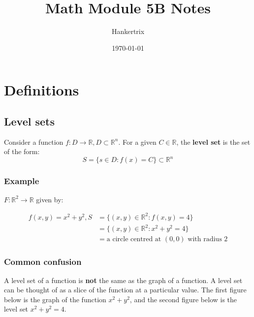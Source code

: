 \documentclass[11pt]{article}
\author{Hankertrix}
\date{\today}
\title{Math Module 5B Notes}
\begin{document}
\maketitle
\setcounter{tocdepth}{2}
\tableofcontents \clearpage\section{Definitions}
\label{sec:orgd9169ac}

\subsection{Level sets}
\label{sec:orge629cca}
Consider a function \(f : D \rightarrow \mathbb{R}, D \subset \mathbb{R}^n\). For a given \(C \in \mathbb{R}\), the \textbf{level set} is the set of the form:
\[S = \{s \in D : f(x) = C\} \subset \mathbb{R}^n\]
\subsubsection{Example}
\label{sec:org67f94d0}
\(F: \mathbb{R}^2 \rightarrow \mathbb{R}\) given by:

\begin{align*}
f(x, y) = x^2 + y^2, S &= \{(x, y) \in \mathbb{R}^2 : f(x, y) = 4\} \\
&= \{(x, y) \in \mathbb{R}^2 : x^2 + y^2 = 4\} \\
&= \text{a circle centred at } (0, 0) \text{ with radius } 2
\end{align*}

\newpage
\subsubsection{Common confusion}
\label{sec:org6c943b2}
A level set of a function is \textbf{not} the same as the graph of a function. A level set can be thought of as a slice of the function at a particular value. The first figure below is the graph of the function \(x^2 + y^2\), and the second figure below is the level set \(x^2 + y^2 = 4\).
\end{document}
